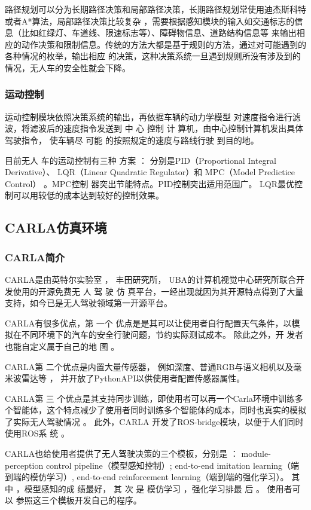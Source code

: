 路径规划可以分为长期路径决策和局部路径决策，长期路径规划常使用迪杰斯科特或者A*算法，局部路径决策比较复杂
，需要根据感知模块的输入如交通标志的信息（比如红绿灯、车道线、限速标志等）、障碍物信息、道路结构信息等
来输出相应的动作决策和限制信息。传统的方法大都是基于规则的方法，通过对可能遇到的各种情况的枚举，输出相应
的决策，这种决策系统一旦遇到规则所没有涉及到的情况，无人车的安全性就会下降。
\subsubsection{运动控制}
运动控制模块依照决策系统的输出，再依据车辆的动力学模型 对速度指令进行滤波，将滤波后的速度指令发送到 中 心
控制 计 算机，由中心控制计算机发出具体驾驶指令， 使车辆尽 可能 的按照规定的速度与路线行驶 到目的地。

目前无人 车的运动控制有三种 方案 ： 分别是PID（Proportional Integral Derivative）、 
LQR（Linear Quadratic Regulator）和
MPC（Model Predictice Control）
 。MPC控制 器突出节能特点。PID控制突出适用范围广。
LQR最优控制可以用较低的成本达到较好的控制效果。


\subsection{CARLA仿真环境}
\subsubsection{CARLA简介}
CARLA是由英特尔实验室 ， 丰田研究所， UBA的计算机视觉中心研究所联合开发使用的开源免费无 人 驾 驶 仿 真平台，一经出现就因为其开源特点得到了大量支持，如今已是无人驾驶领域第一开源平台。

CARLA有很多优点，第
一个 优点是是其可以让使用者自行配置天气条件，以模拟在不同环境下的汽车的安全行驶问题，节约实际测试成本。
除此之外，开 发者也能自定义属于自己的地 图 。

CARLA第 二个优点是内置大量传感器， 例如深度、普通RGB与语义相机以及毫米波雷达等
， 并开放了PythonAPI以供使用者配置传感器属性。

CARLA第 三 个优点是其支持同步训练，即使用者可以再一个Carla环境中训练多个智能体，这个特点减少了使用者同时训练多个智能体的成本，同时也真实的模拟了实际无人驾驶情况 。 此外，CARLA
开发了ROS-bridge模块，以便于人们同时使用ROS系 统 。

CARLA也给使用者提供了无人驾驶决策的三个模板，分别是 ： module-perception control pipeline（模型感知控制）; end-to-end imitation learning（端到端的模仿学习）, end-to-end reinforcement learning（端到端的强化学习）。 其中 ，模型感知的成 绩最好， 其 次 是 模仿学习
，强化学习排最 后 。 使用者可 以 参照这三个模板开发自己的程序。
